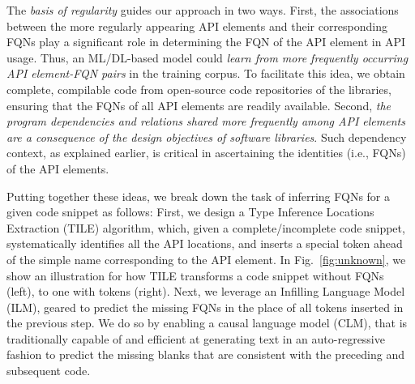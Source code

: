 
The {\em basis of regularity} guides our approach in two ways. First, the associations between the more regularly appearing API elements and their corresponding FQNs play a significant role in determining the FQN of the API element in API usage. Thus, an ML/DL-based model could {\em learn from more frequently occurring API element-FQN pairs} in the training corpus. To facilitate this idea, we obtain complete, compilable code from open-source code repositories of the libraries, ensuring that the FQNs of all API elements are readily available. Second, {\em the program dependencies and relations shared more frequently among API elements are a consequence of the design objectives of software libraries}. Such dependency context, as explained earlier, is critical in ascertaining the identities (i.e., FQNs) of the API elements.


Putting together these ideas, we break down the task of inferring FQNs for a given code snippet as follows: First, we design a Type Inference Locations Extraction (TILE) algorithm, which, given a complete/incomplete code snippet, systematically identifies all the API locations, and inserts a special \code{[blank]} token ahead of the simple name corresponding to the API element. In Fig.~\ref{fig:unknown}, we show an illustration for how TILE transforms a code snippet without FQNs (left), to one with \code{[blank]} tokens (right). Next, we leverage an Infilling Language Model~\cite{} (ILM), geared to predict the missing FQNs in the place of all \code{[blank]} tokens inserted in the previous step. We do so by enabling a causal language model (CLM), that is traditionally capable of and efficient at generating text in an auto-regressive fashion to predict the missing blanks that are consistent with the preceding and subsequent code.



